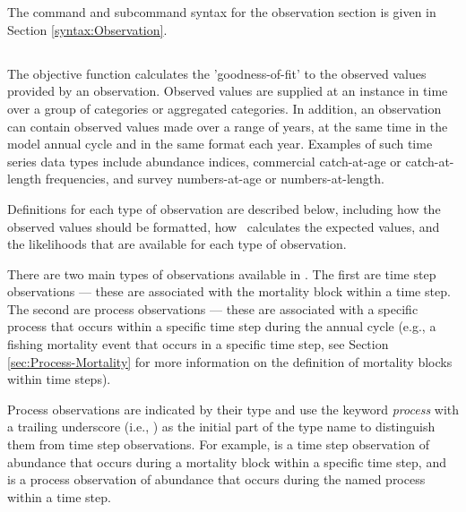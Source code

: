 \section{ \label{sec:Observation}}

The command and subcommand syntax for the observation section is given in Section \ref{syntax:Observation}.

\subsection{}

The objective function calculates the 'goodness-of-fit' to the observed values provided by an observation. Observed values are supplied at an instance in time over a group of categories or aggregated categories. In addition, an observation can contain observed values made over a range of years, at the same time in the model annual cycle and in the same format each year. Examples of such time series data types include abundance indices, commercial \ifAgeBased catch-at-age or \fi catch-at-length frequencies, and survey \ifAgeBased numbers-at-age or \fi numbers-at-length.

Definitions for each type of observation are described below, including how the observed values should be formatted, how \CNAME\ calculates the expected values, and the likelihoods that are available for each type of observation.

There are two main types of observations available in \CNAME. The first are time step observations --- these are associated with the mortality block within a time step. The second are process observations --- these are associated with a specific process that occurs within a specific time step during the annual cycle (e.g., a fishing mortality event that occurs in a specific time step, see Section \ref{sec:Process-Mortality} for more information on the definition of mortality blocks within time steps). 

Process observations are indicated by their type and use the keyword \emph{process} with a trailing underscore (i.e., ) as the initial part of the type name to distinguish them from time step observations. For example,   is a time step observation of abundance that occurs during a mortality block within a specific time step, and  is a process observation of abundance that occurs during the named process within a time step.

